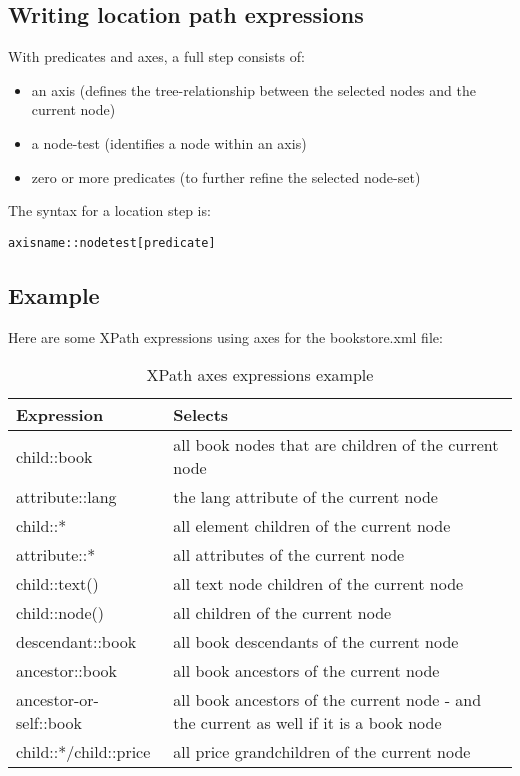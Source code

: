 \documentclass[slides]{pgnotes}
\begin{document}
\subsection{Writing location path expressions}

With predicates and axes, a full step consists of:

\begin{itemize}
\item an axis (defines the tree-relationship between the selected nodes and the current node)
\item a node-test (identifies a node within an axis)
\item zero or more predicates (to further refine the selected node-set)
\end{itemize}

The syntax for a location step is:
\begin{verbatim}
axisname::nodetest[predicate]
\end{verbatim}


\subsection{Example}

Here are some XPath expressions using axes for the bookstore.xml file:

\begin{table}[htbp]
  \begin{tabularx}{1.0\linewidth}{l X}
    \toprule
    \textbf{Expression} & \textbf{Selects} \\
    \midrule
    child::book & 	 all book nodes that are children of the current node \\
    attribute::lang &	 the lang attribute of the current node \\
    child::* &	 all element children of the current node \\
    attribute::* &	 all attributes of the current node \\
    child::text() &	 all text node children of the current node \\ 
    child::node() &	 all children of the current node \\ 
    descendant::book &	 all book descendants of the current node \\ 
    ancestor::book &	 all book ancestors of the current node \\ 
    ancestor-or-self::book &	 all book ancestors of the current node - and the current as well if it is a book node \\
    child::*/child::price &	 all price grandchildren of the current node\\
    \bottomrule
  \end{tabularx}
  \caption{XPath axes expressions example}
  \label{tab:xpath-axes-example}
\end{table}
\end{document}
